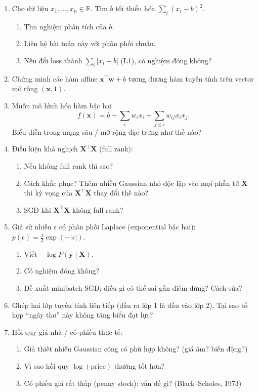 \documentclass[12pt,a4paper]{article}
\begin{document}
\begin{enumerate}
  \item Cho dữ liệu $x_1, \ldots, x_n \in \mathbb{R}$. Tìm $b$ tối thiểu hóa $\sum_i (x_i - b)^2$.
  \begin{enumerate}
    \item Tìm nghiệm phân tích của $b$.
    \item Liên hệ bài toán này với phân phối chuẩn.
    \item Nếu đổi loss thành $\sum_i |x_i - b|$ (L1), có nghiệm đóng không?
  \end{enumerate}

  \item Chứng minh các hàm affine $\mathbf{x}^\top \mathbf{w} + b$ tương đương hàm tuyến tính trên vector mở rộng $(\mathbf{x}, 1)$.

  \item Muốn mô hình hóa hàm bậc hai
  \[
    f(\mathbf{x}) = b + \sum_i w_i x_i + \sum_{j \le i} w_{ij} x_i x_j.
  \]
  Biểu diễn trong mạng sâu / mở rộng đặc trưng như thế nào?

  \item Điều kiện khả nghịch $\mathbf{X}^\top\mathbf{X}$ (full rank):
  \begin{enumerate}
    \item Nếu không full rank thì sao?
    \item Cách khắc phục? Thêm nhiễu Gaussian nhỏ độc lập vào mọi phần tử $\mathbf{X}$ thì kỳ vọng của $\mathbf{X}^\top\mathbf{X}$ thay đổi thế nào?
    \item SGD khi $\mathbf{X}^\top\mathbf{X}$ không full rank?
  \end{enumerate}

  \item Giả sử nhiễu $\epsilon$ có phân phối Laplace (exponential bậc hai): $p(\epsilon) = \frac{1}{2}\exp(-|\epsilon|)$.
  \begin{enumerate}
    \item Viết $-\log P(\mathbf{y} \mid \mathbf{X})$.
    \item Có nghiệm đóng không?
    \item Đề xuất minibatch SGD; điều gì có thể sai gần điểm dừng? Cách sửa?
  \end{enumerate}

  \item Ghép hai lớp tuyến tính liên tiếp (đầu ra lớp 1 là đầu vào lớp 2). Tại sao tổ hợp ``ngây thơ'' này không tăng biểu đạt lực?

  \item Hồi quy giá nhà / cổ phiếu thực tế:
  \begin{enumerate}
    \item Giả thiết nhiễu Gaussian cộng có phù hợp không? (giá âm? biến động?)
    \item Vì sao hồi quy $\log(\mathrm{price})$ thường tốt hơn?
    \item Cổ phiếu giá rất thấp (penny stock): vấn đề gì? (Black--Scholes, 1973)
  \end{enumerate}


\end{enumerate}
\end{document}
